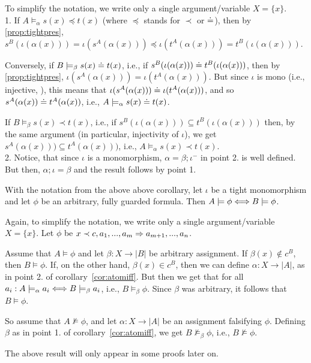 \begin{PROOF}
To simplify the notation, we write only a single argument/variable $X=\{x\}$.
\\[1ex]
1. If $A\models_\alpha s(x)\preceq t(x)$ (where $\preceq$ stands for $\prec$
   or $\mathrel{\dot{=} }$), then by \ref{prop:tightpres},
   $s^B(\iota(\alpha(x)))=\iota(s^A(\alpha(x)))\preceq
   \iota(t^A(\alpha(x)))=t^B(\iota(\alpha(x)))$. 

Conversely, if $B\models_\beta s(x)\mathrel{\dot{=} } t(x)$, i.e., if
$s^B(\iota(\alpha(x)))\mathrel{\dot{=} } t^B(\iota(\alpha(x)))$, then by
\ref{prop:tightpres}, $\iota(s^A(\alpha(x)))= \iota(t^A(\alpha(x)))$. But
since $\iota$ is mono (i.e., injective, \cite{catrel}), this means that 
$\iota(s^A(\alpha(x)))\mathrel{\dot{=} } \iota(t^A(\alpha(x)))$, and so 
$s^A(\alpha(x)) \mathrel{\dot{=} } t^A(\alpha(x))$, i.e., $A\models_\alpha s(x)\mathrel{\dot{=} }
t(x)$. 

If $B\models_\beta s(x)\prec t(x)$, i.e., if
$s^B(\iota(\alpha(x)))\subseteq t^B(\iota(\alpha(x)))$ then, by the same
argument (in particular, injectivity of $\iota$), we get 
$s^A(\alpha(x)))\subseteq t^A(\alpha(x)))$, i.e., $A\models_\alpha s(x)\prec t(x)$.
\\[1ex]
2. Notice, that since $\iota$ is a monomorphism,
$\alpha=\beta;\iota^-$ in point 2. is well defined.
But then, $\alpha;\iota=\beta$ and the result follows by point 1.
\end{PROOF}
\begin{proposition}\label{prop:satiff}
With the notation from the above above corollary, let $\iota$ be a tight monomorphism
and let $\phi$ be an arbitrary, fully
guarded formula. Then $A\models\phi\Longleftrightarrow B\models\phi$.
\end{proposition}
\begin{PROOF}
Again, to simplify the notation, we write only a single argument/variable
$X=\{x\}$. Let $\phi$ be $x\prec c, a_1,...,a_m\Rightarrow a_{m+1},...,a_n$. 

Assume that $A\models\phi$ and let $\beta:X\to|B|$ be arbitrary
assignment. If $\beta(x)\not\in c^B$, then $B\models\phi$. If, on the other
hand, $\beta(x)\in c^B$, then we can define $\alpha:X\to|A|$, as in point
2. of corollary~\ref{cor:atomiff}. But then we get that for all
$a_i:A\models_\alpha a_i\Longleftrightarrow B\models_\beta a_i$, i.e., $B\models_\beta
\phi$. Since $\beta$ was arbitrary, it follows that $B\models\phi$. 

So assume that $A\not\models\phi$, and let $\alpha:X\to|A|$ be an assignment
falsifying $\phi$. Defining $\beta$ as in point 1. of
corollary~\ref{cor:atomiff}, we get $B\not\models_\beta\phi$, i.e., $B\not\models\phi$.
\end{PROOF}
The above result will only appear in some proofs later on.

